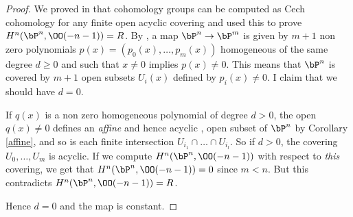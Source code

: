 \begin{proof}
We proved in \cite{cech-draft} that cohomology groups can be computed as Cech cohomology for any
finite open acyclic covering and used this to prove $H^n(\bP^n,\OO(-n-1))=R$.
By , a map $\bP^n\rightarrow\bP^m$ is given by $m+1$ non zero polynomials
$p(x) = (p_0(x),\dots,p_m(x))$ homogeneous of the same degree $d\geqslant 0$ and such that $x\neq 0$ implies $p(x)\neq 0$.
This means that $\bP^n$ is covered by $m+1$ open subsets $U_i(x)$ defined by $p_i(x)\neq 0$.
I claim that we should have $d=0$.

 If $q(x)$ is a non zero homogeneous polynomial of degree $d>0$, the open $q(x)\neq 0$ defines an {\em affine}
 and hence acyclic \cite{cech-draft}, open subset of $\bP^n$ by Corollary \ref{affine}, and so is each finite
 intersection $U_{i_1}\cap\dots\cap U_{i_l}$. So if $d>0$, the covering $U_0,\dots,U_m$ is acyclic.
 If we compute $H^n(\bP^n,\OO(-n-1))$ with respect to {\em this} covering, we get that
 $H^n(\bP^n,\OO(-n-1)) = 0$ since $m<n$. But this contradicts $H^n(\bP^n,\OO(-n-1))=R$.

 Hence $d=0$ and the map is constant.
\end{proof}

